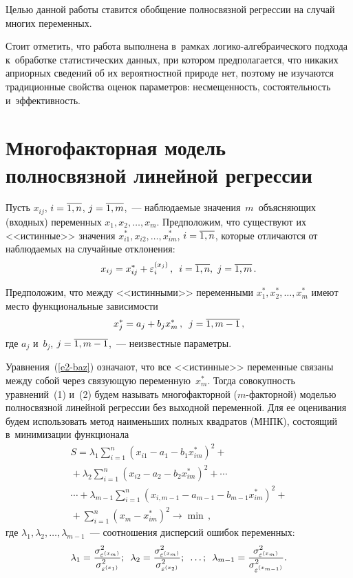 \begin{multicols}{2}
Целью данной 
работы ставится обобщение полносвязной регрессии на случай многих 
переменных.


    
    Стоит отметить, что работа выполнена в~рамках ло\-ги\-ко-ал\-геб\-раи\-че\-ско\-го 
подхода к~обработке статистических данных, при котором предполагается, что 
никаких априорных сведений об их вероятностной природе нет, поэтому не 
изучаются традиционные свойства оценок параметров: несмещенность, 
состоятельность и~эффективность.

\section{Многофакторная модель полносвязной линейной 
регрессии}

    Пусть $x_{ij}$, $i\hm=\overline{1,n}$, $j\hm=\overline{1,m}$,~--- 
наблюдаемые значения~$m$~объясняющих (входных) переменных $x_1, 
x_2,\ldots , x_m$. Предположим, что существуют их <<истинные>> значения 
$x^*_{i1}, x_{i2}, \ldots , x^*_{im}$, $i\hm= \overline{1,n}$, которые 
отличаются от наблюдаемых на случайные отклонения:
    \begin{equation}
    x_{ij}= x_{ij}^*+\varepsilon_i^{(x_j)}\,,\enskip i=\overline{1,n},\ 
j=\overline{1,m}\,.
    \label{e1-baz}
    \end{equation}
    
    Предположим, что между <<истинными>> переменными $x_1^*,x_2^*, 
\ldots , x_m^*$ имеют место функциональные зависимости
    \begin{equation}
    x_j^* =a_j+b_j x_m^*\,,\enskip j=\overline{1,m-1}\,,
    \label{e2-baz}
    \end{equation}
где $a_j$ и~$b_j$, $j\hm= \overline{1,m-1}$,~--- неизвестные параметры.
    
    Уравнения~(\ref{e2-baz}) означают, что все <<истинные>> переменные 
связаны между собой через связующую переменную~$x_m^*$. Тогда 
совокупность уравнений~(1) и~(2) будем называть многофакторной 
($m$-фак\-тор\-ной) моделью полносвязной линейной регрессии без выходной 
переменной. Для ее оценивания будем использовать метод наименьших полных 
квад\-ра\-тов (МНПК), состоящий в~минимизации функционала
\begin{multline}
S=\lambda_1\sum\limits^n_{i=1} \left( x_{i1}-a_1-b_1x^*_{im}\right)^2+{}\\
{}+
\lambda_2\sum\limits^n_{i=1}\left( x_{i2}-a_2-b_2x^*_{im}\right)^2+\cdots\\
\cdots+ \lambda_{m-1} \sum\limits^n_{i=1} \left( x_{i,m-1}-a_{m-1}-b_{m-1} 
x^*_{im}\right)^2+{}\\
{}+
\sum\limits^n_{i=1} \left( x_m-x^*_{im}\right)^2 \to \min\,,
\label{e3-baz}
\end{multline}
где $\lambda_1, \lambda_2, \ldots, \lambda_{m-1}$~---
соотношения дисперсий ошибок переменных:
$$
\lambda_1=\fr{\sigma^2_{\varepsilon^{(x_m)}}}
{\sigma^2_{\varepsilon^{(x_1)}}}; \enskip
\lambda_2\hm=\fr{\sigma^2_{\varepsilon^{(x_m)}}}
{\sigma^2_{\varepsilon^{(x_2)}}}; \enskip\ldots;  \enskip 
\lambda_{m-1}\hm= \fr{\sigma^2_{\varepsilon^{(x_m)}}}
{\sigma^2_{\varepsilon^{(x_{m-1})}}}.
$$


\end{multicols}

